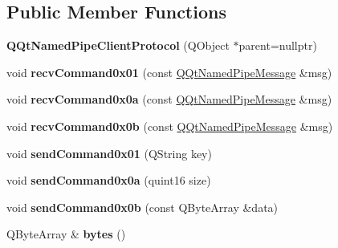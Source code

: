\subsection*{Public Member Functions}
\begin{DoxyCompactItemize}
\item 
\mbox{\label{class_q_qt_named_pipe_client_protocol_a89dbb9aa284425b85bf1e247ceb4b01b}} 
{\bfseries Q\+Qt\+Named\+Pipe\+Client\+Protocol} (Q\+Object $\ast$parent=nullptr)
\item 
\mbox{\label{class_q_qt_named_pipe_client_protocol_a050df87a512e2cba036a8971ee525d6d}} 
void {\bfseries recv\+Command0x01} (const \mbox{\hyperlink{class_q_qt_named_pipe_message}{Q\+Qt\+Named\+Pipe\+Message}} \&msg)
\item 
\mbox{\label{class_q_qt_named_pipe_client_protocol_ad353e32042f9b29a9377256fbaa344b6}} 
void {\bfseries recv\+Command0x0a} (const \mbox{\hyperlink{class_q_qt_named_pipe_message}{Q\+Qt\+Named\+Pipe\+Message}} \&msg)
\item 
\mbox{\label{class_q_qt_named_pipe_client_protocol_ad5fcff7b667052e578de63bbf508eb10}} 
void {\bfseries recv\+Command0x0b} (const \mbox{\hyperlink{class_q_qt_named_pipe_message}{Q\+Qt\+Named\+Pipe\+Message}} \&msg)
\item 
\mbox{\label{class_q_qt_named_pipe_client_protocol_a1b1964b292aa4319209f2d1dbb3dc3e3}} 
void {\bfseries send\+Command0x01} (Q\+String key)
\item 
\mbox{\label{class_q_qt_named_pipe_client_protocol_ac1c45583e2727a476eee6294fe7f28a3}} 
void {\bfseries send\+Command0x0a} (quint16 size)
\item 
\mbox{\label{class_q_qt_named_pipe_client_protocol_aecb6ab15f00b66dd59c970c5119b324b}} 
void {\bfseries send\+Command0x0b} (const Q\+Byte\+Array \&data)
\item 
\mbox{\label{class_q_qt_named_pipe_client_protocol_a71987aacffbd0fc3004e265de6c37518}} 
Q\+Byte\+Array \& {\bfseries bytes} ()
\end{DoxyCompactItemize}

